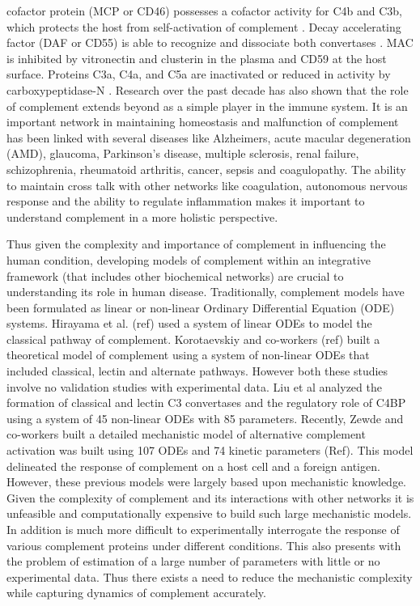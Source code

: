 \documentclass[12pt]{article}
\begin{document}
cofactor protein (MCP or CD46) possesses a cofactor activity for C4b and C3b, which protects the host from self-activation of complement \cite{riley2004cd46}.  Decay accelerating factor (DAF or CD55) is able to recognize and dissociate both convertases \cite{lukacik2004complement}. MAC is inhibited by vitronectin and clusterin in the plasma and CD59 at the host surface.
Proteins C3a, C4a, and C5a are inactivated or reduced in activity by carboxypeptidase-N \cite{liszewski1995control}. Research over the past decade has also shown that the role of complement extends beyond as a simple player in the immune system. It is an important network in maintaining homeostasis and malfunction of complement has been linked with several diseases like Alzheimers, acute macular degeneration (AMD), glaucoma, Parkinson's disease, multiple sclerosis, renal failure, schizophrenia, rheumatoid arthritis, cancer, sepsis and coagulopathy. The ability to maintain cross talk with other networks like coagulation, autonomous nervous response and the ability to regulate inflammation makes it important to understand complement in a more holistic perspective. 

Thus given the complexity and importance of complement in influencing the human condition, developing models of complement within an integrative framework (that includes other biochemical networks) are crucial to understanding its role in human disease. Traditionally, complement models have been formulated as linear or non-linear Ordinary Differential Equation (ODE) systems. Hirayama  et al. (ref) used a system of linear ODEs to model the classical pathway of complement. Korotaevskiy and co-workers (ref) built a theoretical model of complement using a system of non-linear ODEs that included classical, lectin and alternate pathways. However both these studies involve no validation studies with experimental data. Liu et al analyzed the formation of classical and lectin C3 convertases and the regulatory role of C4BP using a system of 45 non-linear ODEs with 85 parameters.  Recently, Zewde and co-workers built a detailed mechanistic model of alternative complement activation was built using 107 ODEs and 74 kinetic parameters (Ref). This model delineated the response of complement on a host cell and a foreign antigen. However, these previous models were largely based upon mechanistic knowledge.  Given the complexity of complement and its interactions with other networks it is unfeasible and computationally expensive to build such large mechanistic models. In addition is much more difficult to experimentally interrogate the response of various complement proteins under different conditions. This also presents with the problem of estimation of a large number of parameters with little or no experimental data. Thus there exists a need to reduce the mechanistic complexity while capturing dynamics of complement accurately.
\end{document}
